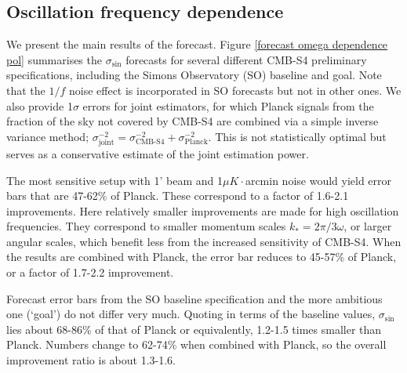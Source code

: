 \subsection{Oscillation frequency dependence}

We present the main results of the forecast. Figure \ref{forecast omega dependence pol} summarises the $\sigma_{\sin}$ forecasts for several different CMB-S4 preliminary specifications, including the Simons Observatory (SO) baseline and goal. Note that the $1/f$ noise effect is incorporated in SO forecasts but not in other ones. We also provide 1$\sigma$ errors for joint estimators, for which Planck signals from the fraction of the sky not covered by CMB-S4 are combined via a simple inverse variance method; $\sigma_\text{joint}^{-2} = \sigma_\text{CMB-S4}^{-2} +  \sigma_\text{Planck}^{-2}$. This is not statistically optimal but serves as a conservative estimate of the joint estimation power.

The most sensitive setup with 1' beam and 1$\mu K \cdot$arcmin noise would yield error bars that are 47-62\% of Planck. These correspond to a factor of 1.6-2.1 improvements. Here relatively smaller improvements are made for high oscillation frequencies. They correspond to smaller momentum scales $k_\ast = 2\pi/3\omega$, or larger angular scales, which benefit less from the increased sensitivity of CMB-S4. When the results are combined with Planck, the error bar reduces to 45-57\% of Planck, or a factor of 1.7-2.2 improvement.

Forecast error bars from the SO baseline specification and the more ambitious one (`goal') do not differ very much. Quoting in terms of the baseline values, $\sigma_{\sin}$ lies about 68-86\% of that of Planck or equivalently, 1.2-1.5 times smaller than Planck. Numbers change to 62-74\% when combined with Planck, so the overall improvement ratio is about 1.3-1.6.

